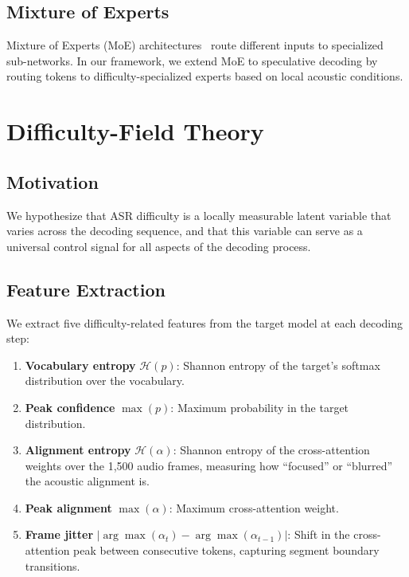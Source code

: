 \documentclass[11pt,a4paper]{article}
\begin{document}
\subsection{Mixture of Experts}
Mixture of Experts (MoE) architectures~\cite{shazeer2017moe} route different inputs to specialized sub-networks.
In our framework, we extend MoE to speculative decoding by routing tokens to difficulty-specialized experts based on local acoustic conditions.


\section{Difficulty-Field Theory}

\subsection{Motivation}
We hypothesize that ASR difficulty is a locally measurable latent variable that varies across the decoding sequence, and that this variable can serve as a universal control signal for all aspects of the decoding process.

\subsection{Feature Extraction}
We extract five difficulty-related features from the target model at each decoding step:

\begin{enumerate}[leftmargin=*,itemsep=2pt]
    \item \textbf{Vocabulary entropy} $\mathcal{H}(p)$: Shannon entropy of the target's softmax distribution over the vocabulary.
    \item \textbf{Peak confidence} $\max(p)$: Maximum probability in the target distribution.
    \item \textbf{Alignment entropy} $\mathcal{H}(\alpha)$: Shannon entropy of the cross-attention weights over the 1,500 audio frames, measuring how ``focused'' or ``blurred'' the acoustic alignment is.
    \item \textbf{Peak alignment} $\max(\alpha)$: Maximum cross-attention weight.
    \item \textbf{Frame jitter} $|\arg\max(\alpha_t) - \arg\max(\alpha_{t-1})|$: Shift in the cross-attention peak between consecutive tokens, capturing segment boundary transitions.
\end{enumerate}
\end{document}
